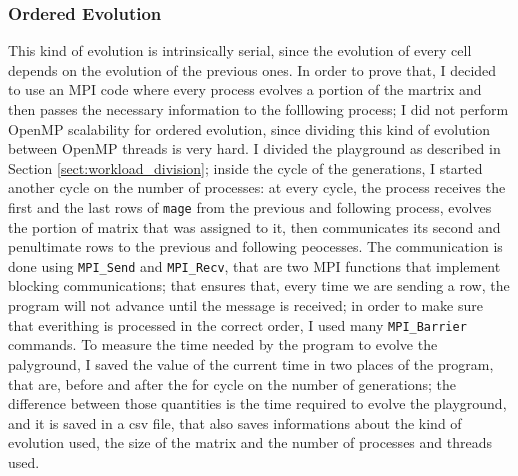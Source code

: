 \documentclass[12pt]{article}
\begin{document}
     \subsubsection{Ordered Evolution}
     This kind of evolution is intrinsically serial, since the evolution of every cell depends on the evolution of the previous ones. In order to prove that, I decided to use an MPI code where every process evolves a portion of the martrix and then passes the necessary information to the folllowing process; I did not perform OpenMP scalability for ordered evolution, since dividing this kind of evolution between OpenMP threads is very hard.\newline
     I divided the playground as described in Section \ref{sect:workload_division}; inside the cycle of the generations, I started another cycle on the number of processes: at every cycle, the process receives the first and the last rows of \lstinline|mage| from the previous and following process, evolves the portion of matrix that was assigned to it, then communicates its second and penultimate rows to the previous and following peocesses.\newline
     The communication is done using \lstinline|MPI_Send| and \lstinline|MPI_Recv|, that are two MPI functions that implement blocking communications; that ensures that, every time we are sending a row, the program will not advance until the message is received; in order to make sure that everithing is processed in the correct order, I used many \lstinline|MPI_Barrier| commands.\newline
     To measure the time needed by the program to evolve the palyground, I saved the value of the current time in two places of the program, that are, before and after the for cycle on the number of generations; the difference between those quantities is the time required to evolve the playground, and it is saved in a csv file, that also saves informations about the kind of evolution used, the size of the matrix and the number of processes and threads used.\newline\newline
    
\end{document}
